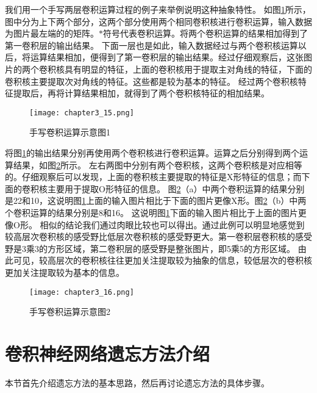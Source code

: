 我们用一个手写两层卷积运算过程的例子来举例说明这种抽象特性。
如图\ref{fig:chapter3_15}所示，图中分为上下两个部分，这两个部分使用两个相同卷积核进行卷积运算，输入数据为图片最左端的的矩阵。$\ast$符号代表卷积运算。将两个卷积运算的结果相加得到了第一卷积层的输出结果。
下面一层也是如此，输入数据经过与两个卷积核运算以后，将运算结果相加，便得到了第一卷积层的输出结果。经过仔细观察后，这张图片的两个卷积核具有明显的特征，上面的卷积核用于提取主对角线的特征，下面的卷积核主要提取次对角线的特征。这些都是较为基本的特征。
经过两个卷积核特征提取后，再将计算结果相加，就得到了两个卷积核特征的相加结果。
\begin{figure}
    \centering
    \texttt{[image: chapter3\_15.png]}
    \caption{手写卷积运算示意图1}
    \label{fig:chapter3_15}
\end{figure}

将图\ref{fig:chapter3_15}的输出结果分别再使用两个卷积核进行卷积运算。运算之后分别得到两个运算结果，如图\ref{fig:chapter3_16}所示。
左右两图中分别有两个卷积核，这两个卷积核是对应相等的。仔细观察后可以发现，上面的卷积核主要提取的特征是X形特征的信息；而下面的卷积核主要用于提取O形特征的信息。
图\ref{fig:chapter3_16}（a）中两个卷积运算的结果分别是22和10，这说明图\ref{fig:chapter3_15}上面的输入图片相比于下面的图片更像X形。图\ref{fig:chapter3_16}（b）中两个卷积运算的结果分别是8和16。
这说明图\ref{fig:chapter3_15}下面的输入图片相比于上面的图片更像O形。
相似的结论我们通过肉眼比较也可以得出。通过此例可以明显地感觉到较高层次卷积核的感受野比低层次卷积核的感受野更大。第一卷积层卷积核的感受野是3乘3的方形区域，第二卷积层的感受野是整张图片，即5乘5的方形区域。
由此可见，较高层次的卷积核往往更加关注提取较为抽象的信息，较低层次的卷积核更加关注提取较为基本的信息。
\begin{figure}
    \centering
    \texttt{[image: chapter3\_16.png]}
    \caption{手写卷积运算示意图2}
    \label{fig:chapter3_16}
\end{figure}

\section{卷积神经网络遗忘方法介绍}
本节首先介绍遗忘方法的基本思路，然后再讨论遗忘方法的具体步骤。
